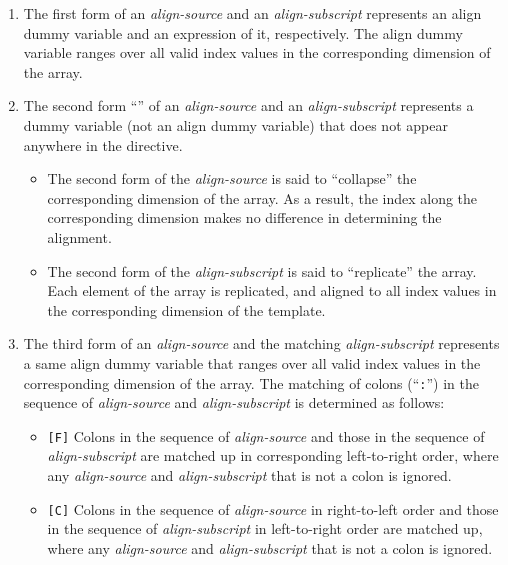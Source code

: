 \begin{enumerate}
\item The first form of an {\it align-source} and an {\it
      align-subscript} represents an align dummy variable and an
      expression of it, respectively. The align dummy variable ranges
      over all valid index values in the corresponding dimension of the
      array.
\item The second form ``{\tt *}'' of an {\it align-source} and an {\it
      align-subscript} represents a dummy variable (not an align dummy
      variable) that does not appear anywhere in the directive.
      \begin{itemize} 
       \item The second form of the {\it align-source} is said to
	     ``collapse'' the corresponding dimension of the array. As a
	     result, the index along the corresponding dimension makes
	     no difference in determining the alignment.
       \item The second form of the {\it align-subscript} is said to
	     ``replicate'' the array. Each element of the array is
	     replicated, and aligned to all index values in the
	     corresponding dimension of the template.
      \end{itemize}
\item The third form of an {\it align-source} and the matching {\it
      align-subscript} represents a same align dummy variable that
      ranges over all valid index values in the corresponding dimension
      of the array. The matching of colons (``{\tt :}'') in the sequence
      of {\it align-source} and {\it align-subscript} is determined as
      follows:

      \begin{itemize}
       \item \verb![F]! Colons in the sequence of {\it align-source} and
	     those in the sequence of {\it align-subscript} are matched
	     up in corresponding left-to-right order, where any {\it
	     align-source} and {\it align-subscript} that is not a colon
	     is ignored.
       \item \verb![C]! Colons in the sequence of {\it align-source} in
	     right-to-left order and those in the sequence of {\it 
	     align-subscript} in left-to-right order are matched up,
	     where any {\it align-source} and {\it align-subscript} that
	     is not a colon is ignored.
      \end{itemize}


\end{enumerate}

